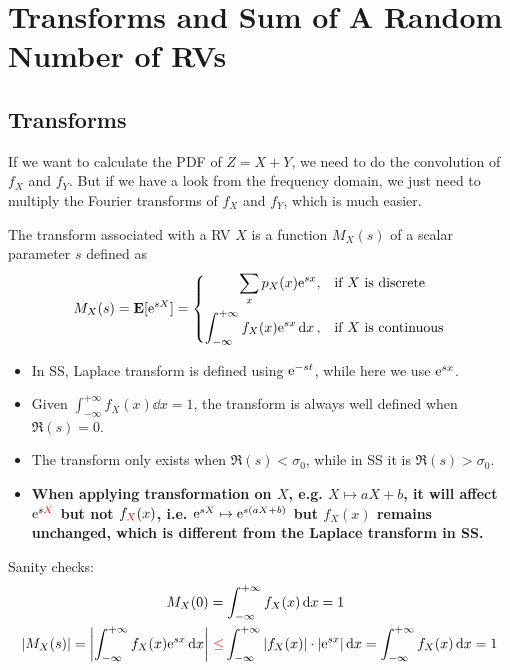 \chapter{Transforms and Sum of A Random Number of RVs}

\section{Transforms}
If we want to calculate the PDF of $Z = X + Y$, we need to do the convolution of $f_{X}$ and $f_{Y}$. But if we have a look from the frequency domain, we just need to multiply the Fourier transforms of $f_{X}$ and $f_{Y}$, which is much easier.
\begin{definition}
    The transform associated with a RV $X$ is a function $M_{X}(s)$ of a scalar parameter $s$ defined as
    \begin{equation}
        M_{X}(s) = \mathbf{E}[\mathrm{e}^{sX}] = \left\{\begin{aligned}
            \sum_{x} p_{X}(x) \mathrm{e}^{sx}, \quad &\text{if } X \text{ is discrete} \\
            \int_{-\infty}^{+\infty} f_{X}(x) \mathrm{e}^{sx} \dd{x}, \quad &\text{if } X \text{ is continuous}
        \end{aligned}\right.
    \end{equation}
\end{definition}
\begin{remark}
    \begin{itemize}
        \item In SS, Laplace transform is defined using $\mathrm{e}^{-st}$, while here we use $\mathrm{e}^{sx}$.
        \item Given $\int_{-\infty}^{+\infty} f_{X}(x) \dd{x} = 1$, the transform is always well defined when $\Re(s) = 0$.
        \item The transform only exists when $\Re(s) < \sigma_0$, while in SS it is $\Re(s) > \sigma_0$.
        \item \textbf{When applying transformation on $X$, e.g. $X \mapsto aX + b$, it will affect $\mathrm{e}^{s\textcolor{red}{X}}$ but not $f_{\textcolor{red}{X}}(x)$, i.e. $\mathrm{e}^{sX} \mapsto \mathrm{e}^{s(aX + b)}$ but $f_{X}(x)$ remains unchanged, which is different from the Laplace transform in SS.}
    \end{itemize}
\end{remark}
\noindent Sanity checks:
    \begin{equation}
    \begin{aligned}
        M_{X}(0) &= \int_{-\infty}^{+\infty} f_{X}(x) \dd{x} = 1 \\ 
        \abs{M_{X}(s)} = \abs{\int_{-\infty}^{+\infty} f_{X}(x) \mathrm{e}^{sx} \dd{x}} &\textcolor{red}{~\leq} \int_{-\infty}^{+\infty} \abs{f_{X}(x)} \cdot \abs{\mathrm{e}^{sx}} \dd{x} = \int_{-\infty}^{+\infty} f_{X}(x) \dd{x} = 1
    \end{aligned}
    \end{equation}
